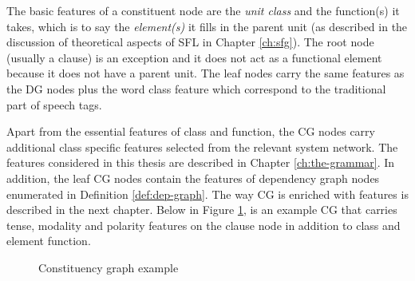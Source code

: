 The basic features of a constituent node are the \textit{unit class} and the function(s) it takes, which is to say the \textit{element(s)} it fills in the parent unit (as described in the discussion of theoretical aspects of SFL in Chapter \ref{ch:sfg}). The root node (usually a clause) is an exception and it does not act as a functional element because it does not have a parent unit. The leaf nodes carry the same features as the DG nodes plus the word class feature which correspond to the traditional part of speech tags. 

Apart from the essential features of class and function, the CG nodes carry additional class specific features selected from the relevant system network. The features considered in this thesis are described in Chapter \ref{ch:the-grammar}. In addition, the leaf CG nodes contain the features of dependency graph nodes enumerated in Definition \ref{def:dep-graph}. The way CG is enriched with features is described in the next chapter. Below in Figure \ref{fig:mcg-graph}, is an example CG that carries tense, modality and polarity features on the clause node in addition to class and element function.

\begin{figure}[!ht]
\centering
{}
\caption{Constituency graph example}
\label{fig:mcg-graph}
\end{figure}


